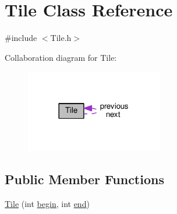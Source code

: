 \hypertarget{classTile}{\section{Tile Class Reference}
\label{classTile}
}


{\ttfamily \#include $<$Tile.\+h$>$}



Collaboration diagram for Tile\+:\nopagebreak
\begin{figure}[H]
\begin{center}
\leavevmode
\includegraphics[width=170pt]{classTile__coll__graph}
\end{center}
\end{figure}
\subsection*{Public Member Functions}
\begin{DoxyCompactItemize}
\item 
\hyperlink{classTile_a4f59f006f6a5e1cd5cc5b269a29d067b}{Tile} (int \hyperlink{classTile_abf2eb9ed61ada2b1a35386e5f20bd350}{begin}, int \hyperlink{classTile_a39ee840ddb65bf9ad1fb12667e92993c}{end})
\end{DoxyCompactItemize}
